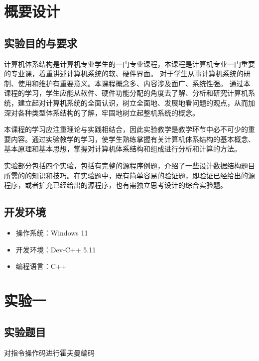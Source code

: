 \documentclass[UTF8,12pt]{article}
\begin{document}
\begin{titlepage}
    
\end{titlepage}

\begin{center}
    \tableofcontents
\end{center}
\newpage

\section{概要设计}
\subsection{实验目的与要求}
计算机体系结构是计算机专业学生的一门专业课程，本课程是计算机专业一门重要的专业课，着重讲述计算机系统的软、硬件界面。
对于学生从事计算机系统的研制、使用和维护有重要意义。本课程概念多、内容涉及面广、系统性强。
通过本课程的学习，学生应能从软件、硬件功能分配的角度去了解、分析和研究计算机系统，建立起对计算机系统的全面认识，树立全面地、发展地看问题的观点，从而加深对各种类型体系结构的了解，牢固地树立起整机系统的概念。

本课程的学习应注重理论与实践相结合，因此实验教学是教学环节中必不可少的重要内容。通过实验教学的学习，使学生熟练掌握有关计算机体系结构的基本概念、基本原理和基本思想，掌握对计算机体系结构和组成进行分析和计算的方法。

实验部分包括四个实验，包括有完整的源程序例题，介绍了一些设计数据结构题目所需的的知识和技巧。在实验题中，既有简单容易的验证题，即验证已经给出的源程序，或者扩充已经给出的源程序，也有需独立思考设计的综合实验题。

\subsection{开发环境}
\begin{itemize}
    \item 操作系统：Windows 11
    \item 开发环境：Dev-C++ 5.11
    \item 编程语言：C++
\end{itemize}

\newpage

\section{实验一}
\subsection{实验题目}
对指令操作码进行霍夫曼编码
\end{document}
